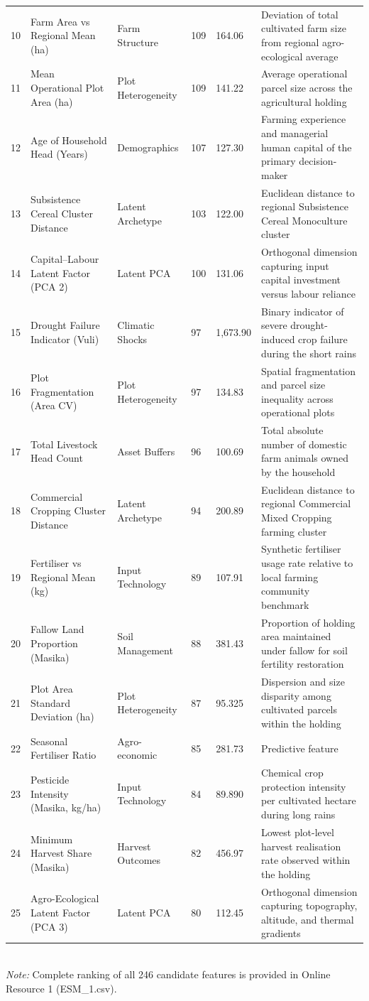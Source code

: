 \documentclass[10pt,a4paper]{article}
\begin{document}
\begin{table}[htbp]
{\begin{tabular}{llllll}
10 & Farm Area vs Regional Mean (ha) & Farm Structure & 109 & 164.06 & Deviation of total cultivated farm size from regional agro-ecological average \\
11 & Mean Operational Plot Area (ha) & Plot Heterogeneity & 109 & 141.22 & Average operational parcel size across the agricultural holding \\
12 & Age of Household Head (Years) & Demographics & 107 & 127.30 & Farming experience and managerial human capital of the primary decision-maker \\
13 & Subsistence Cereal Cluster Distance & Latent Archetype & 103 & 122.00 & Euclidean distance to regional Subsistence Cereal Monoculture cluster \\
14 & Capital–Labour Latent Factor (PCA 2) & Latent PCA & 100 & 131.06 & Orthogonal dimension capturing input capital investment versus labour reliance \\
15 & Drought Failure Indicator (Vuli) & Climatic Shocks & 97 & 1,673.90 & Binary indicator of severe drought-induced crop failure during the short rains \\
16 & Plot Fragmentation (Area CV) & Plot Heterogeneity & 97 & 134.83 & Spatial fragmentation and parcel size inequality across operational plots \\
17 & Total Livestock Head Count & Asset Buffers & 96 & 100.69 & Total absolute number of domestic farm animals owned by the household \\
18 & Commercial Cropping Cluster Distance & Latent Archetype & 94 & 200.89 & Euclidean distance to regional Commercial Mixed Cropping farming cluster \\
19 & Fertiliser vs Regional Mean (kg) & Input Technology & 89 & 107.91 & Synthetic fertiliser usage rate relative to local farming community benchmark \\
20 & Fallow Land Proportion (Masika) & Soil Management & 88 & 381.43 & Proportion of holding area maintained under fallow for soil fertility restoration \\
21 & Plot Area Standard Deviation (ha) & Plot Heterogeneity & 87 & 95.325 & Dispersion and size disparity among cultivated parcels within the holding \\
22 & Seasonal Fertiliser Ratio & Agro-economic & 85 & 281.73 & Predictive feature \\
23 & Pesticide Intensity (Masika, kg/ha) & Input Technology & 84 & 89.890 & Chemical crop protection intensity per cultivated hectare during long rains \\
24 & Minimum Harvest Share (Masika) & Harvest Outcomes & 82 & 456.97 & Lowest plot-level harvest realisation rate observed within the holding \\
25 & Agro-Ecological Latent Factor (PCA 3) & Latent PCA & 80 & 112.45 & Orthogonal dimension capturing topography, altitude, and thermal gradients \\
\bottomrule
\end{tabular}%
}
\\[4pt]\footnotesize\textit{Note:} Complete ranking of all 246 candidate features is provided in Online Resource 1 (ESM\_1.csv).
\end{table}
\end{document}
